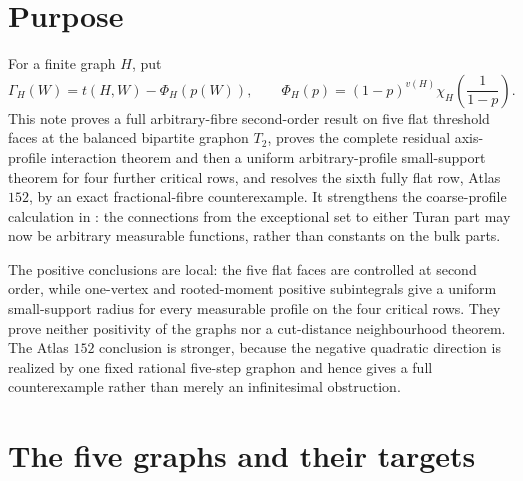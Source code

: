\documentclass[11pt]{article}
\begin{document}
\section{Purpose}

For a finite graph $H$, put
\[
 \Gamma_H(W)=t(H,W)-\Phi_H(p(W)),
 \qquad
 \Phi_H(p)=(1-p)^{v(H)}
 \chi_H\!\left(\frac1{1-p}\right).
\]
This note proves a full arbitrary-fibre second-order result on five flat
threshold faces at the balanced bipartite graphon $T_2$, proves the complete
residual axis-profile interaction theorem and then a uniform
arbitrary-profile small-support theorem for four further critical rows, and
resolves the sixth fully flat row, Atlas $152$, by an exact fractional-fibre
counterexample.  It strengthens the
coarse-profile calculation in
:
the connections from the exceptional set to either Turan part may now be
arbitrary measurable functions, rather than constants on the bulk parts.

The positive conclusions are local: the five flat faces are controlled at
second order, while one-vertex and rooted-moment positive subintegrals give
a uniform small-support radius for every measurable profile on the four
critical rows.  They prove neither positivity of the graphs nor a
cut-distance neighbourhood theorem.  The
Atlas $152$ conclusion is stronger, because the negative quadratic direction
is realized by one fixed rational five-step graphon and hence gives a full
counterexample rather than merely an infinitesimal obstruction.

\section{The five graphs and their targets}
\end{document}
